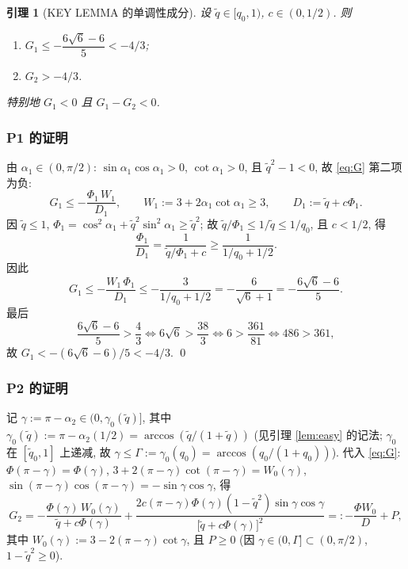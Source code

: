 \documentclass[UTF8]{ctexart}
\newtheorem{lemma}[theorem]{引理}
\begin{document}
\begin{lemma}[KEY LEMMA 的单调性成分]\label{lem:P}
设 $\tilde q\in[q_0,1)$, $c\in(0,1/2)$. 则
\begin{enumerate}
	\item[(P1)] $G_1\le-\dfrac{6\sqrt6-6}{5}<-4/3$;
	\item[(P2)] $G_2>-4/3$.
\end{enumerate}
特别地 $G_1<0$ 且 $G_1-G_2<0$.
\end{lemma}

\subsubsection{P1 的证明}

由 $\alpha_1\in(0,\pi/2)$: $\sin\alpha_1\cos\alpha_1>0$, $\cot\alpha_1>0$, 且
$\tilde q^2-1<0$, 故 \eqref{eq:G} 第二项为负:
\begin{equation}
	G_1\le-\frac{\Phi_1\,W_1}{D_1},\qquad
	W_1:=3+2\alpha_1\cot\alpha_1\ge3,\qquad
	D_1:=\tilde q+c\Phi_1.
\end{equation}
因 $\tilde q\le1$, $\Phi_1=\cos^2\alpha_1+\tilde q^2\sin^2\alpha_1\ge\tilde q^2$;
故 $\tilde q/\Phi_1\le1/\tilde q\le1/q_0$, 且 $c<1/2$, 得
\begin{equation}
	\frac{\Phi_1}{D_1}=\frac{1}{\tilde q/\Phi_1+c}
	\ge\frac{1}{1/q_0+1/2}.
\end{equation}
因此
\begin{equation}
	G_1\le-\frac{W_1\,\Phi_1}{D_1}\le-\frac{3}{1/q_0+1/2}
	=-\frac{6}{\sqrt6+1}=-\frac{6\sqrt6-6}{5}.
\end{equation}
最后
\begin{equation}
	\frac{6\sqrt6-6}{5}>\frac43
	\iff 6\sqrt6>\frac{38}{3}\iff 6>\frac{361}{81}\iff 486>361,
\end{equation}
故 $G_1<-(6\sqrt6-6)/5<-4/3$. \qed

\subsubsection{P2 的证明}

记 $\gamma:=\pi-\alpha_2\in(0,\gamma_0(\tilde q)]$, 其中
$\gamma_0(\tilde q):=\pi-\alpha_2(1/2)=\arccos(\tilde q/(1+\tilde q))$
(见引理 \ref{lem:easy} 的记法; $\gamma_0$ 在 $[\tilde q_0,1]$ 上递减, 故
$\gamma\le\Gamma:=\gamma_0(q_0)=\arccos(q_0/(1+q_0))$). 代入 \eqref{eq:G}:
$\Phi(\pi-\gamma)=\Phi(\gamma)$, $3+2(\pi-\gamma)\cot(\pi-\gamma)=W_0(\gamma)$,
$\sin(\pi-\gamma)\cos(\pi-\gamma)=-\sin\gamma\cos\gamma$, 得
\begin{equation}
	G_2=-\frac{\Phi(\gamma)\,W_0(\gamma)}{\tilde q+c\Phi(\gamma)}
	+\frac{2c(\pi-\gamma)\Phi(\gamma)(1-\tilde q^2)\sin\gamma\cos\gamma}
	{\bigl[\tilde q+c\Phi(\gamma)\bigr]^2}
	=:-\frac{\Phi W_0}{D}+P,
	\label{eq:G2}
\end{equation}
其中 $W_0(\gamma):=3-2(\pi-\gamma)\cot\gamma$, 且 $P\ge0$ (因
$\gamma\in(0,\Gamma]\subset(0,\pi/2)$, $1-\tilde q^2\ge0$).
\end{document}

